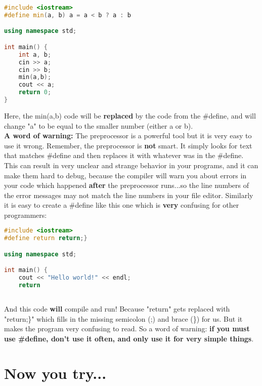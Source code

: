 \documentclass[a4paper,12pt]{article} %
\begin{document}
\clearpage

\vspace{5mm}
\begin{lstlisting}[language=C++]
#include <iostream>
#define min(a, b) a = a < b ? a : b

using namespace std;

int main() {
	int a, b;
	cin >> a;
	cin >> b;
	min(a,b);
	cout << a;
	return 0;
}
\end{lstlisting}

\noindent
Here, the min(a,b) code will be \textbf{replaced} by the code from the \#define, and will change "a" to be equal to the smaller number (either a or b).\\

\noindent
\textbf{A word of warning: } The preprocessor is a powerful tool but it is very easy to use it wrong. Remember, the preprocessor is \textbf{not} smart. It simply looks for text that matches \#define and then replaces it with whatever was in the \#define. This can result in very unclear and strange behavior in your programs, and it can make them hard to debug, because the compiler will warn you about errors in your code which happened \textbf{after} the preprocessor runs...so the line numbers of the error messages may not match the line numbers in your file editor. Similarly it is easy to create a \#define like this one which is \textbf{very} confusing for other programmers:

\vspace{5mm}
\begin{lstlisting}[language=C++]
#include <iostream>
#define return return;}

using namespace std;

int main() {
	cout << "Hello world!" << endl;
	return
		
\end{lstlisting}

\noindent
And this code \textbf{will} compile and run! Because "return" gets replaced with "return;\}" which fills in the missing semicolon (;) and brace (\}) for us. But it makes the program very confusing to read. So a word of warning: \textbf{if you must use \#define, don't use it often, and only use it for very simple things}.\\

\clearpage

\section{Now you try...}
\end{document}
